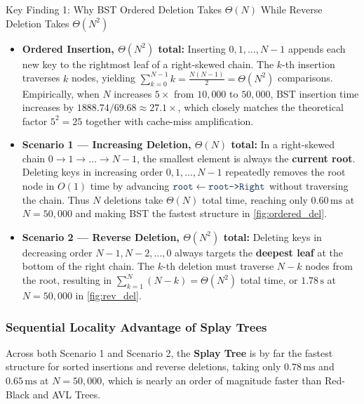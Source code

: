 \documentclass[10pt, a4paper]{article}
\newcommand{\code}[1]{\texttt{\color{primary!90!black}#1}}
\begin{document}
\begin{insightbox}{Key Finding 1: Why BST Ordered Deletion Takes $\Theta(N)$ While Reverse Deletion Takes $\Theta(N^2)$}
\begin{itemize}
  \item \textbf{Ordered Insertion, $\Theta(N^2)$ total:} Inserting $0, 1, \dots, N-1$ appends each new key to the rightmost leaf of a right-skewed chain. The $k$-th insertion traverses $k$ nodes, yielding $\sum_{k=0}^{N-1} k = \frac{N(N-1)}{2} = \Theta(N^2)$ comparisons. Empirically, when $N$ increases $5\times$ from $10{,}000$ to $50{,}000$, BST insertion time increases by $1888.74 / 69.68 \approx 27.1\times$, which closely matches the theoretical factor $5^2 = 25$ together with cache-miss amplification.
  \item \textbf{Scenario 1 --- Increasing Deletion, $\Theta(N)$ total:} In a right-skewed chain $0 \to 1 \to \dots \to N-1$, the smallest element is always the \textbf{current root}. Deleting keys in increasing order $0, 1, \dots, N-1$ repeatedly removes the root node in $O(1)$ time by advancing $\code{root} \gets \code{root->Right}$ without traversing the chain. Thus $N$ deletions take $\Theta(N)$ total time, reaching only $0.60\,\text{ms}$ at $N=50{,}000$ and making BST the fastest structure in \cref{fig:ordered_del}.
  \item \textbf{Scenario 2 --- Reverse Deletion, $\Theta(N^2)$ total:} Deleting keys in decreasing order $N-1, N-2, \dots, 0$ always targets the \textbf{deepest leaf} at the bottom of the right chain. The $k$-th deletion must traverse $N-k$ nodes from the root, resulting in $\sum_{k=1}^{N} (N-k) = \Theta(N^2)$ total time, or $1.78\,\text{s}$ at $N=50{,}000$ in \cref{fig:rev_del}.
\end{itemize}
\end{insightbox}

\subsubsection{Sequential Locality Advantage of Splay Trees}
Across both Scenario 1 and Scenario 2, the \textbf{Splay Tree} is by far the fastest structure for sorted insertions and reverse deletions, taking only $0.78\,\text{ms}$ and $0.65\,\text{ms}$ at $N=50{,}000$, which is nearly an order of magnitude faster than Red-Black and AVL Trees.
\end{document}
